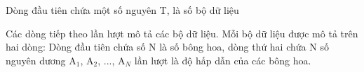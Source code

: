 Dòng đầu tiên chứa một số nguyên T, là số bộ dữ liệu

Các dòng tiếp theo lần lượt mô tả các bộ dữ liệu. Mỗi bộ dữ liệu được mô tả trên hai dòng: Dòng đầu tiên chứa số N là số bông hoa, dòng thứ hai chứa N số nguyên dương A$_1$, A$_2$, ..., A$_N$ lần lượt là độ hấp dẫn của các bông hoa.